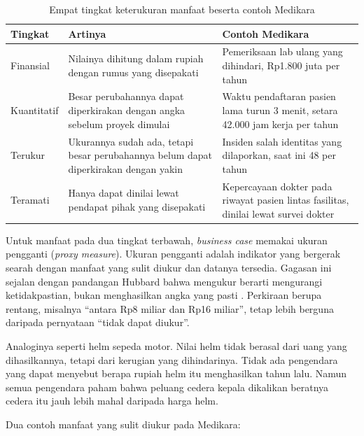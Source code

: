 \begin{table}[!htb]
  \centering
  \caption{Empat tingkat keterukuran manfaat beserta contoh Medikara}
  \label{tab:ch13-keterukuran}
  \footnotesize
  \begin{tabularx}{\textwidth}{>{\raggedright\arraybackslash}p{1.7cm}
                               >{\raggedright\arraybackslash}X
                               >{\raggedright\arraybackslash}X}
    \hline
    \textbf{Tingkat} & \textbf{Artinya} & \textbf{Contoh Medikara} \\
    \hline
    Finansial & Nilainya dihitung dalam rupiah dengan rumus yang disepakati &
      Pemeriksaan lab ulang yang dihindari, Rp1.800 juta per tahun \\
    \hline
    Kuantitatif & Besar perubahannya dapat diperkirakan dengan angka sebelum
      proyek dimulai & Waktu pendaftaran pasien lama turun 3 menit, setara
      42.000 jam kerja per tahun \\
    \hline
    Terukur & Ukurannya sudah ada, tetapi besar perubahannya belum dapat
      diperkirakan dengan yakin & Insiden salah identitas yang dilaporkan,
      saat ini 48 per tahun \\
    \hline
    Teramati & Hanya dapat dinilai lewat pendapat pihak yang disepakati &
      Kepercayaan dokter pada riwayat pasien lintas fasilitas, dinilai lewat
      survei dokter \\
    \hline
  \end{tabularx}
\end{table}

Untuk manfaat pada dua tingkat terbawah, \textit{business case} memakai ukuran
pengganti (\textit{proxy measure}). Ukuran pengganti adalah indikator yang
bergerak searah dengan manfaat yang sulit diukur dan datanya tersedia.
Gagasan ini sejalan dengan pandangan Hubbard bahwa mengukur berarti
mengurangi ketidakpastian, bukan menghasilkan angka yang pasti
\cite{c13-hubbard2014}. Perkiraan berupa rentang, misalnya ``antara Rp8 miliar
dan Rp16 miliar'', tetap lebih berguna daripada pernyataan ``tidak dapat
diukur''.

Analoginya seperti helm sepeda motor. Nilai helm tidak berasal dari uang yang
dihasilkannya, tetapi dari kerugian yang dihindarinya. Tidak ada pengendara
yang dapat menyebut berapa rupiah helm itu menghasilkan tahun lalu. Namun
semua pengendara paham bahwa peluang cedera kepala dikalikan beratnya cedera
itu jauh lebih mahal daripada harga helm.

Dua contoh manfaat yang sulit diukur pada Medikara:

